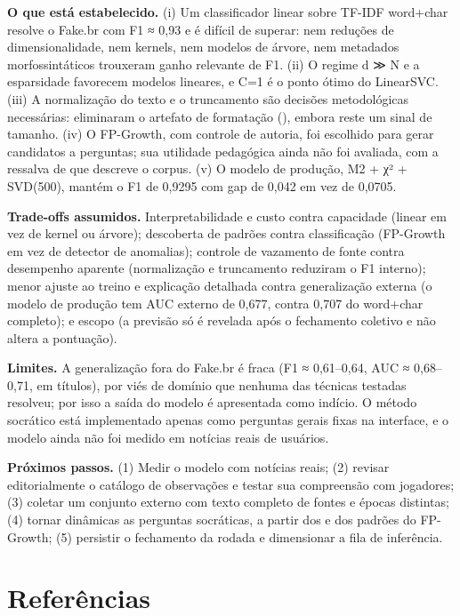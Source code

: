 \documentclass[
  brazilian,
  11pt,
]{article}
\begin{document}
\textbf{O que está estabelecido.} (i) Um classificador linear sobre TF-IDF word+char resolve o Fake.br com F1 ≈ 0,93 e é difícil de superar: nem reduções de dimensionalidade, nem kernels, nem modelos de árvore, nem metadados morfossintáticos trouxeram ganho relevante de F1. (ii) O regime d ≫ N e a esparsidade favorecem modelos lineares, e C=1 é o ponto ótimo do LinearSVC. (iii) A normalização do texto e o truncamento são decisões metodológicas necessárias: eliminaram o artefato de formatação (), embora reste um sinal de tamanho. (iv) O FP-Growth, com controle de autoria, foi escolhido para gerar candidatos a perguntas; sua utilidade pedagógica ainda não foi avaliada, com a ressalva de que descreve o corpus. (v) O modelo de produção, M2 + χ² + SVD(500), mantém o F1 de 0,9295 com gap de 0,042 em vez de 0,0705.

\textbf{Trade-offs assumidos.} Interpretabilidade e custo contra capacidade (linear em vez de kernel ou árvore); descoberta de padrões contra classificação (FP-Growth em vez de detector de anomalias); controle de vazamento de fonte contra desempenho aparente (normalização e truncamento reduziram o F1 interno); menor ajuste ao treino e explicação detalhada contra generalização externa (o modelo de produção tem AUC externo de 0,677, contra 0,707 do word+char completo); e escopo (a previsão só é revelada após o fechamento coletivo e não altera a pontuação).

\textbf{Limites.} A generalização fora do Fake.br é fraca (F1 ≈ 0,61–0,64, AUC ≈ 0,68–0,71, em títulos), por viés de domínio que nenhuma das técnicas testadas resolveu; por isso a saída do modelo é apresentada como indício. O método socrático está implementado apenas como perguntas gerais fixas na interface, e o modelo ainda não foi medido em notícias reais de usuários.

\textbf{Próximos passos.} (1) Medir o modelo com notícias reais; (2) revisar editorialmente o catálogo de observações e testar sua compreensão com jogadores; (3) coletar um conjunto externo com texto completo de fontes e épocas distintas; (4) tornar dinâmicas as perguntas socráticas, a partir dos  e dos padrões do FP-Growth; (5) persistir o fechamento da rodada e dimensionar a fila de inferência.




\section{Referências}\label{referuxeancias}
\end{document}
